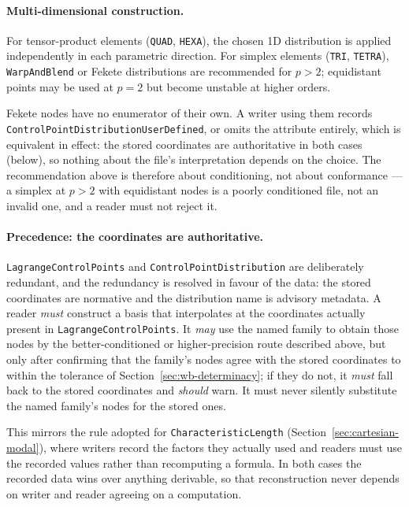 \documentclass[11pt,letterpaper]{article}
\newif\ifvfourdraft
\newcommand{\vfour}[1]{\ifvfourdraft\textcolor{v4violet}{#1}\else#1\fi}
\begin{document}
\paragraph{Multi-dimensional construction.}
For tensor-product elements (\texttt{QUAD}, \texttt{HEXA}), the chosen 1D distribution is
applied independently in each parametric direction.  For simplex elements (\texttt{TRI},
\texttt{TETRA}), \texttt{WarpAndBlend} or Fekete distributions are recommended for $p>2$;
equidistant points may be used at $p=2$ but become unstable at higher orders.

\vfour{Fekete nodes have no enumerator of their own.  A writer using them records
\texttt{Control\-Point\-Distribution\-User\-Defined}, or omits the attribute
entirely,
which is equivalent in effect: the stored coordinates are authoritative in both
cases (below), so nothing about the file's interpretation depends on the choice.
The recommendation above is therefore about conditioning, not about conformance
--- a simplex at $p>2$ with equidistant nodes is a poorly conditioned file, not
an invalid one, and a reader must not reject it.}

\paragraph{Precedence: the coordinates are authoritative.}
\texttt{LagrangeControlPoints} and \texttt{ControlPointDistribution} are
deliberately redundant, and the redundancy is resolved in favour of the data: the stored
coordinates are normative and the distribution name is advisory metadata.  A reader
\emph{must} construct a basis that interpolates at the coordinates actually present in
\texttt{LagrangeControlPoints}.  It \emph{may} use the named family to obtain those nodes by
the better-conditioned or higher-precision route described above, but only after confirming
that the family's nodes agree with the stored coordinates to within the tolerance
\vfour{of Section~\ref{sec:wb-determinacy}}; if
they do not, it \emph{must} fall back to the stored coordinates and \emph{should} warn.  It
must never silently substitute the named family's nodes for the stored ones.

This mirrors the rule adopted for \texttt{CharacteristicLength}
(Section~\ref{sec:cartesian-modal}), where writers record the factors they actually used and
readers must use the recorded values rather than recomputing a formula.  In both cases the
recorded data wins over anything derivable, so that reconstruction never depends on writer
and reader agreeing on a computation.
\end{document}
